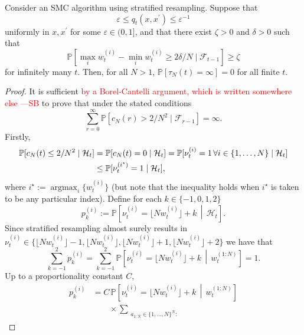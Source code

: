 \documentclass{article}
\newcommand{\seb}[1]{\xspace\textcolor{red}{#1 ---SB}\xspace} %
\theoremstyle{definition}
\newcommand{\Prob}{\mathbb{P}}
\newcommand{\1}[1]{\mathbbm{1}_{#1}} %
\newcommand{\midd}{\,\middle|\,}        %
\newcommand{\flnw}[1][i]{\lfloor N w_t^{(#1)} \rfloor}
\DeclareMathOperator*{\argmax}{argmax}
\begin{document}
\begin{lemma}\label{thm:strat_nontriviality}
Consider an SMC algorithm using stratified resampling.
Suppose that 
\begin{equation*}
\varepsilon \leq q_t(x, x^\prime) \leq \varepsilon^{-1}
\end{equation*}
uniformly in $x,x^\prime$ for some $\varepsilon \in (0,1]$, and that there exist $\zeta >0$ and $\delta >0$ such that 
\begin{equation*}
\Prob[ \max_i w_t^{(i)} - \min_i w_t^{(i)} \geq 2\delta/N \mid \mathcal{F}_{t-1} ] \geq \zeta
\end{equation*}
 for infinitely many $t$. Then, for all $N>1$, $\Prob[ \tau_N(t) = \infty ] =0$ for all finite $t$.
\end{lemma}


\begin{proof}
It is sufficient \seb{by a Borel-Cantelli argument, which is written somewhere else} to prove that under the stated conditions
\begin{equation*}
\sum_{r=0}^\infty \Prob[ c_N(r) > 2/N^2  \mid \mathcal{F}_{r-1} ] = \infty .
\end{equation*}
Firstly,
\begin{align}
\Prob[ c_N(t) \leq 2/N^2 \mid \mathcal{H}_t ]
&= \Prob[ c_N(t) =0 \mid \mathcal{H}_t ]
= \Prob[ \nu_t^{(i)} =1 \,\forall i\in\{1,\dots,N\} \mid \mathcal{H}_t ] \notag\\
&\leq \Prob[ \nu_t^{(i^\star)} =1 \mid \mathcal{H}_t ] , \label{eq:cNnonzero}
\end{align}
where $i^\star := \argmax_i \{ w_t^{(i)} \}$ (but note that the inequality holds when $i^\star$ is taken to be any particular index).
Define for each $k\in\{-1,0,1,2\}$
\begin{equation*}
p_k^{(i)} := \Prob \left[ \nu_t^{(i)} = \flnw + k \midd \mathcal{H}_t \right] .
\end{equation*}
Since stratified resampling almost surely results in $\nu_t^{(i)} \in \{ \flnw-1, \flnw, \flnw+1, \flnw+2 \}$ we have that
\begin{equation*}
\sum_{k=-1}^2 p_k^{(i)} 
= \sum_{k=-1}^2 \Prob \left[ \nu_t^{(i)} = \flnw + k \midd w_t^{(1:N)} \right]
= 1 .
\end{equation*}
Up to a proportionality constant $C$,
\begin{align*}
p_k^{(i)} 
&= C \, \Prob \left[ \nu_t^{(i)} = \flnw + k \midd w_t^{(1:N)} \right] \\
    &\qquad \times \sum_{\substack{a_{1:N} \in \{1,\dots,N\}^N : 
}}
\end{align*}
\end{proof}
\end{document}

